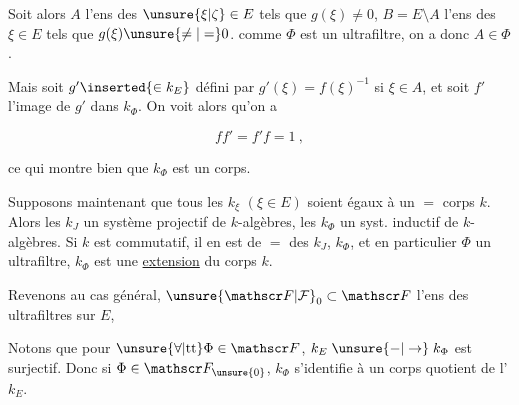 

Soit alors $A$ l'ens des $\unsure{\xi|\zeta}\in E$ tels que $g(\xi)\ne0$, $B=E\setminus A$ l'ens des $\xi\in E$ tels que $g(\xi)\unsure{\ne|=}0$.  comme $\Phi$ est un ultrafiltre, on a donc $A\in\Phi$.

Mais soit $g'\inserted{\in k_E}$ défini par $g'(\xi)=f(\xi)^{-1}$ si $\xi\in A$,  et soit $f'$ l'image de $g'$ dans $k_\Phi$. On voit alors qu'on a

\[
ff'=f'f=1\ ,
\]

ce qui montre bien que $k_\Phi$ est un corps.

Supposons maintenant que tous les $k_\xi$ $(\xi\in E)$ soient égaux à un $=$ corps $k$. Alors les $k_J$  un système projectif de $k$-algèbres, les $k_\Phi$ un syst. inductif de $k$-algèbres. Si $k$ est commutatif, il en est de $=$ des $k_J$, $k_\Phi$, et en particulier  $\Phi$ un ultrafiltre, $k_\Phi$ est une \uline{extension} du corps $k$.

Revenons au cas général,     $\unsure{\mathscr F|\mathcal F}_0\subset\mathscr F$ l'ens des ultrafiltres sur $E$,

Notons que pour $\unsure{\forall|\mathrm{tt}}\Phi\in\mathscr F$, $k_E\mathrel{\unsure{-|\to}}k_\Phi$ est surjectif. Donc si $\Phi\in\mathscr F_{\unsure{0}}$, $k_\Phi$ s'identifie à un corps quotient de l' $k_E$.

